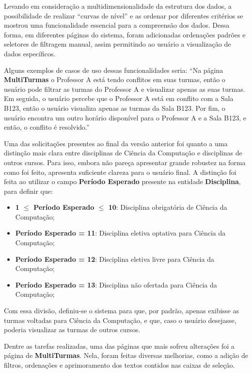 Levando em consideração a multidimensionalidade da estrutura dos dados, a possibilidade de realizar ``curvas de nível'' e as ordenar por diferentes critérios se mostrou uma funcionalidade essencial para a compreensão dos dados. Dessa forma, em diferentes páginas do sistema, foram adicionadas ordenações padrões e seletores de filtragem manual, assim permitindo ao usuário a visualização de dados específicos.

Alguns exemplos de casos de uso dessas funcionalidades seria: ``Na página \textbf{MultiTurmas} o Professor A está tendo conflitos em suas turmas, então o usuário pode filtrar as turmas do Professor A e visualizar apenas as suas turmas. Em seguida, o usuário percebe que o Professor A está em conflito com a Sala B123, então o usuário visualiza apenas as turmas da Sala B123. Por fim, o usuário encontra um outro horário disponível para o Professor A e a Sala B123, e então, o conflito é resolvido.''

Uma das solicitações presentes ao final da versão anterior foi quanto a uma distinção mais clara entre disciplinas de Ciência da Computação e disciplinas de outros cursos. Para isso, embora não pareça apresentar grande robustez na forma como foi feito, apresenta suficiente clareza para o usuário final. A distinção foi feita ao utilizar o campo \textbf{Período Esperado} presente na entidade \textbf{Disciplina}, para definir que:

\begin{itemize}
  \item \textbf{1 $\leq$ Período Esperado $\leq$ 10}: Disciplina obrigatória de Ciência da Computação;
  \item \textbf{Período Esperado = 11}: Disciplina eletiva optativa para Ciência da Computação;
  \item \textbf{Período Esperado = 12}: Disciplina eletiva livre para Ciência da Computação;
  \item \textbf{Período Esperado = 13}: Disciplina não ofertada para Ciência da Computação;
\end{itemize}

Com essa divisão, definiu-se o sistema para que, por padrão, apenas exibisse as turmas voltadas para Ciência da Computação, e que, caso o usuário desejasse, poderia visualizar as turmas de outros cursos.

 \label{ssssec:MultiTurmas}

Dentre as tarefas realizadas, uma das páginas que mais sofreu alterações foi a página de \textbf{MultiTurmas}. Nela, foram feitas diversas melhorias, como a adição de filtros, ordenações e aprimoramento dos textos contidos nas caixas de seleção.

